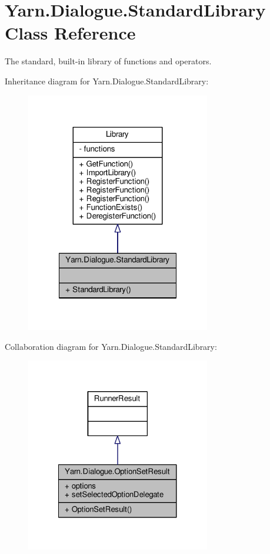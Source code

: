 \hypertarget{a00154}{\section{Yarn.\-Dialogue.\-Standard\-Library Class Reference}
\label{a00154}
}


The standard, built-\/in library of functions and operators.  




Inheritance diagram for Yarn.\-Dialogue.\-Standard\-Library\-:
\nopagebreak
\begin{figure}[H]
\begin{center}
\leavevmode
\includegraphics[width=228pt]{a00616}
\end{center}
\end{figure}


Collaboration diagram for Yarn.\-Dialogue.\-Standard\-Library\-:
\nopagebreak
\begin{figure}[H]
\begin{center}
\leavevmode
\includegraphics[width=228pt]{a00617}
\end{center}
\end{figure}
